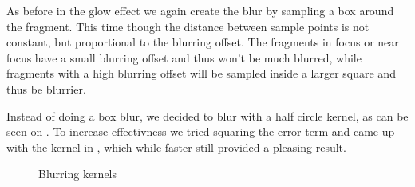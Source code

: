 As before in the glow effect we again create the blur by sampling a
box around the fragment. This time though the distance between sample
points is not constant, but proportional to the blurring offset. The
fragments in focus or near focus have a small blurring offset and thus
won't be much blurred, while fragments with a high blurring offset
will be sampled inside a larger square and thus be blurrier.

Instead of doing a box blur, we decided to blur with a half circle
kernel, as can be seen on . To increase
effectivness we tried squaring the error term and came up with the
kernel in , which while faster still
provided a pleasing result.

\begin{figure}
  \centering
  \caption{Blurring kernels}
\end{figure}
        

      
